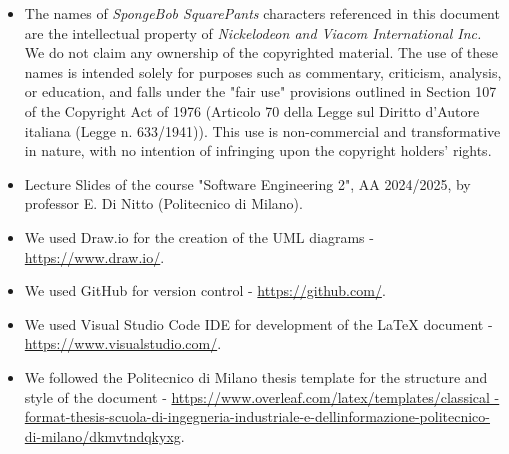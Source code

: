 \renewcommand{\thesection}{\Alph{section}}
\begin{itemize}
    \item The names of \textit{SpongeBob SquarePants} characters referenced in this document are the intellectual property of \textit{Nickelodeon and Viacom International Inc.}
    We do not claim any ownership of the copyrighted material. The use of these names is intended solely for purposes such as commentary, criticism, analysis, 
    or education, and falls under the "fair use" provisions outlined in Section 107 of the Copyright Act of 1976 (Articolo 70 della Legge sul Diritto d'Autore 
    italiana (Legge n. 633/1941)). This use is non-commercial and transformative in nature, with no intention of infringing upon the copyright holders' rights.
    
    \item Lecture Slides of the course "Software Engineering 2", AA 2024/2025, by professor E. Di Nitto (Politecnico di Milano).
    
    \item We used Draw.io for the creation of the UML diagrams - \url{https://www.draw.io/}.
    
    \item We used GitHub for version control - \url{https://github.com/}.
    
    \item We used Visual Studio Code IDE for development of the LaTeX document - \url{https://www.visualstudio.com/}.
    
    \item We followed the Politecnico di Milano thesis template for the structure and style of the document -
    \url{https://www.overleaf.com/latex/templates/classical
    -format-thesis-scuola-di-ingegneria-industriale-e-dellinformazione-politecnico-di-milano/dkmvtndqkyxg}.

\end{itemize}